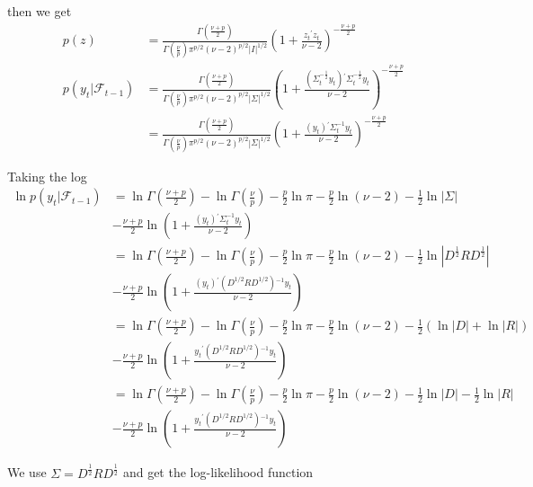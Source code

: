 \documentclass{article}
\begin{document}
then we get 
\begin{align*}
    p(z)&=\frac{\Gamma\left(\frac{\nu+p}{2}\right)}{\Gamma\left(\frac{\nu}{p}\right)\pi^{p/2}\left(\nu-2\right)^{p/2}|I|^{1/2}}\left(1+\frac{z_{t}{}^{\prime}z_{t}}{\nu-2}\right)^{-\frac{\nu+p}{2}}\\
	p\left(y_{t}|\mathcal{F}_{t-1}\right)&=\frac{\Gamma\left(\frac{\nu+p}{2}\right)}{\Gamma\left(\frac{\nu}{p}\right)\pi^{p/2}\left(\nu-2\right)^{p/2}|\Sigma|^{1/2}}\left(1+\frac{\left(\Sigma_{t}^{-\frac{1}{2}}y_{t}\right){}^{\prime}\Sigma_{t}^{-\frac{1}{2}}y_{t}}{\nu-2}\right)^{-\frac{\nu+p}{2}}\\
	&=\frac{\Gamma\left(\frac{\nu+p}{2}\right)}{\Gamma\left(\frac{\nu}{p}\right)\pi^{p/2}\left(\nu-2\right)^{p/2}|\Sigma|^{1/2}}\left(1+\frac{\left(y_{t}\right){}^{\prime}\Sigma_{t}^{-1}y_{t}}{\nu-2}\right)^{-\frac{\nu+p}{2}}
\end{align*}

Taking the log 
\begin{align*}
    \ln p\left(y_{t}|\mathcal{F}_{t-1}\right)&=\ln\Gamma\left(\frac{\nu+p}{2}\right)-\ln\Gamma\left(\frac{\nu}{p}\right)-\frac{p}{2}\ln\pi-\frac{p}{2}\ln\left(\nu-2\right)-\frac{1}{2}\ln|\Sigma|\\
	&-\frac{\nu+p}{2}\ln\left(1+\frac{\left(y_{t}\right){}^{\prime}\Sigma_{t}^{-1}y_{t}}{\nu-2}\right)\\
	&=\ln\Gamma\left(\frac{\nu+p}{2}\right)-\ln\Gamma\left(\frac{\nu}{p}\right)-\frac{p}{2}\ln\pi-\frac{p}{2}\ln\left(\nu-2\right)-\frac{1}{2}\ln|D^{\frac{1}{2}}RD^{\frac{1}{2}}|\\
	&-\frac{\nu+p}{2}\ln\left(1+\frac{\left(y_{t}\right){}^{\prime}\left(D^{1/2}RD^{1/2}\right){}^{-1}y_{t}}{\nu-2}\right)\\
	&=\ln\Gamma\left(\frac{\nu+p}{2}\right)-\ln\Gamma\left(\frac{\nu}{p}\right)-\frac{p}{2}\ln\pi-\frac{p}{2}\ln\left(\nu-2\right)-\frac{1}{2}\left(\ln\left|D\right|+\ln\left|R\right|\right)\\
	&-\frac{\nu+p}{2}\ln\left(1+\frac{y_{t}{}^{\prime}\left(D^{1/2}RD^{1/2}\right){}^{-1}y_{t}}{\nu-2}\right)\\
	&=\ln\Gamma\left(\frac{\nu+p}{2}\right)-\ln\Gamma\left(\frac{\nu}{p}\right)-\frac{p}{2}\ln\pi-\frac{p}{2}\ln\left(\nu-2\right)-\frac{1}{2}\ln\left|D\right|-\frac{1}{2}\ln\left|R\right|\\
	&-\frac{\nu+p}{2}\ln\left(1+\frac{y_{t}{}^{\prime}\left(D^{1/2}RD^{1/2}\right){}^{-1}y_{t}}{\nu-2}\right)
\end{align*}

We use $\Sigma=D^{\frac{1}{2}}RD^{\frac{1}{2}}$ and get the log-likelihood function 
\end{document}
